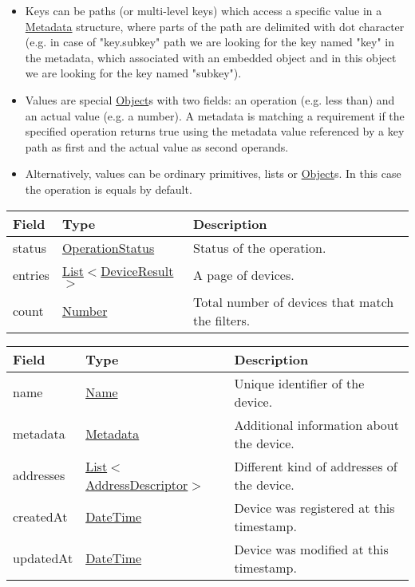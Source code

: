\documentclass[a4paper]{arrowhead}
\newcommand{\pref}[1]{{\textcolor{ArrowheadGrey}{\hyperref[sec:model:primitives:#1]{#1}}}}
\begin{document}
\begin{itemize}
    \item Keys can be paths (or multi-level keys) which access a specific value in a \hyperref[sec:model:Metadata]{Metadata} structure, where parts of the path are delimited with dot character (e.g. in case of "key.subkey" path we are looking for the key named "key" in the metadata, which associated with an embedded object and in this object we are looking for the key named "subkey").
    \item Values are special \pref{Object}s with two fields: an operation (e.g. less than) and an actual value (e.g. a number). A metadata is matching a requirement if the specified operation returns true using the metadata value referenced by a key path as first and the actual value as second operands. 
    \item Alternatively, values can be ordinary primitives, lists or \pref{Object}s. In this case the operation is equals by default.
\end{itemize}

\clearpage

\label{sec:model:DeviceListResponse}

\begin{table}[ht!]
\begin{tabularx}{\textwidth}{| p{3cm} | p{6cm} | X |} \hline
\rowcolor{gray!33} Field & Type      & Description \\ \hline
status & \pref{OperationStatus} & Status of the operation. \\ \hline
entries & \pref{List}$<$\hyperref[sec:model:DeviceResult]{DeviceResult}$>$ & A page of devices. \\ \hline
count & \pref{Number} & Total number of devices that match the filters. \\ \hline
\end{tabularx}
\end{table}

\label{sec:model:DeviceResult}
 
\begin{table}[ht!]
\begin{tabularx}{\textwidth}{| p{4.25cm} | p{4cm} | X |} \hline
\rowcolor{gray!33} Field & Type      & Description \\ \hline
name & \pref{Name} & Unique identifier of the device. \\ \hline
metadata & \hyperref[sec:model:Metadata]{Metadata} & Additional information about the device. \\ \hline
addresses &  \pref{List}$<$\hyperref[sec:model:AddressDescriptor]{AddressDescriptor}$>$ & Different kind of addresses of the device.  \\ \hline
createdAt & \pref{DateTime} & Device was registered at this timestamp. \\ \hline
updatedAt & \pref{DateTime} & Device was modified at this timestamp. \\ \hline
\end{tabularx}
\end{table}
\end{document}

